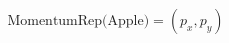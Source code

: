 \documentclass[preview]{standalone}
\begin{document}
\begin{align*}
\text{MomentumRep(Apple)}=(p_x, p_y)
\end{align*}
\end{document}
